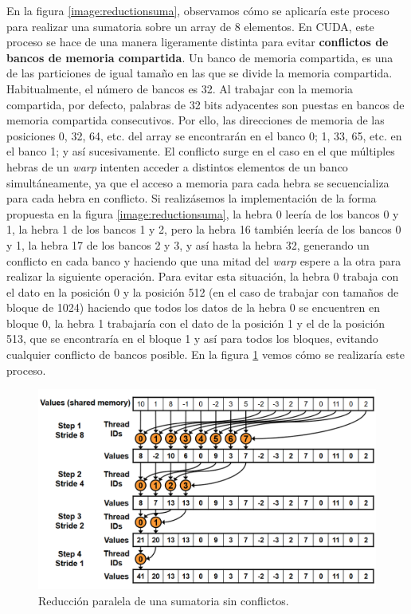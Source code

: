 En la figura \ref{image:reductionsuma}, observamos cómo se aplicaría este proceso para realizar una sumatoria sobre un array de 8 elementos. En CUDA, este proceso se hace de una manera ligeramente distinta para evitar \textbf{conflictos de bancos de memoria compartida}. Un banco de memoria compartida, es una de las particiones de igual tamaño en las que se divide la memoria compartida. Habitualmente, el número de bancos es 32. Al trabajar con la memoria compartida, por defecto, palabras de 32 bits adyacentes son puestas en bancos de memoria compartida consecutivos. Por ello, las direcciones de memoria de las posiciones 0, 32, 64, etc. del array se encontrarán en el banco 0; 1, 33, 65, etc. en el banco 1; y así sucesivamente. El conflicto surge en el caso en el que múltiples hebras de un \textit{warp} intenten acceder a distintos elementos de un banco simultáneamente, ya que el acceso a memoria para cada hebra se secuencializa para cada hebra en conflicto. Si realizásemos la implementación de la forma propuesta en la figura \ref{image:reductionsuma}, la hebra 0 leería de los bancos 0 y 1, la hebra 1 de los bancos 1 y 2, pero la hebra 16 también leería de los bancos 0 y 1, la hebra 17 de los bancos 2 y 3, y así hasta la hebra 32, generando un conflicto en cada banco y haciendo que una mitad del \textit{warp} espere a la otra para realizar la siguiente operación. Para evitar esta situación, la hebra 0 trabaja con el dato en la posición 0 y la posición 512 (en el caso de trabajar con tamaños de bloque de 1024) haciendo que todos los datos de la hebra 0 se encuentren en bloque 0, la hebra 1 trabajaría con el dato de la posición 1 y el de la posición 513, que se encontraría en el bloque 1 y así para todos los bloques, evitando cualquier conflicto de bancos posible. En la figura \ref{image:realcudareductionsuma} vemos cómo se realizaría este proceso.

\begin{figure}[H]
\centering
\includegraphics[scale=0.43]{imagenes/parallel_reduce_cuda.png}
\caption{Reducción paralela de una sumatoria sin conflictos.}
\label{image:realcudareductionsuma}
\end{figure}

